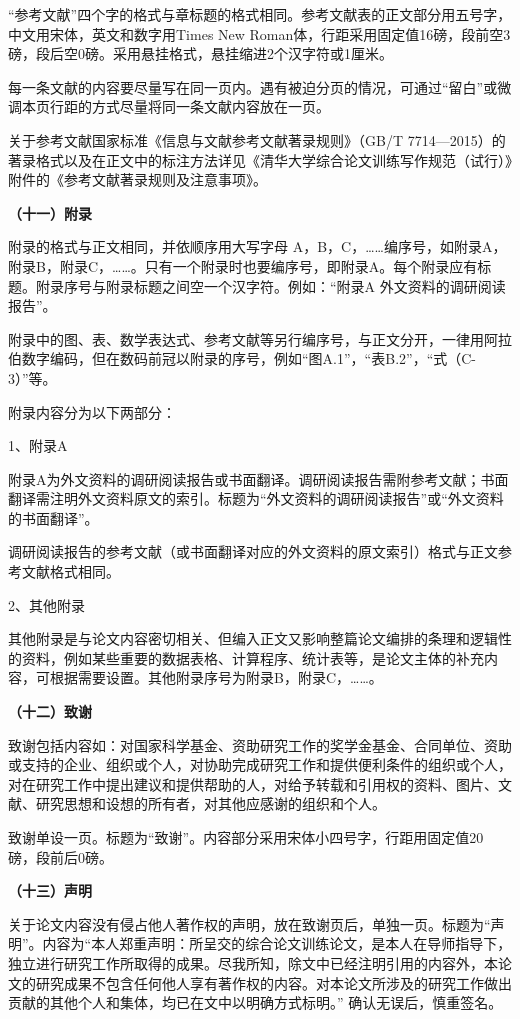 \documentclass{Diploma}
\begin{document}
\begin{}
“参考文献”四个字的格式与章标题的格式相同。参考文献表的正文部分用五号字，中文用宋体，英文和数字用Times New Roman体，行距采用固定值16磅，段前空3磅，段后空0磅。采用悬挂格式，悬挂缩进2个汉字符或1厘米。

每一条文献的内容要尽量写在同一页内。遇有被迫分页的情况，可通过“留白”或微调本页行距的方式尽量将同一条文献内容放在一页。

关于参考文献国家标准《信息与文献参考文献著录规则》（GB/T 7714—2015）的著录格式以及在正文中的标注方法详见《清华大学综合论文训练写作规范（试行）》附件的《参考文献著录规则及注意事项》。

\noindent\textbf{（十一）附录}

附录的格式与正文相同，并依顺序用大写字母 A，B，C，……编序号，如附录A，附录B，附录C，……。只有一个附录时也要编序号，即附录A。每个附录应有标题。附录序号与附录标题之间空一个汉字符。例如：“附录A 外文资料的调研阅读报告”。

附录中的图、表、数学表达式、参考文献等另行编序号，与正文分开，一律用阿拉伯数字编码，但在数码前冠以附录的序号，例如“图A.1”，“表B.2”，“式（C-3）”等。

附录内容分为以下两部分：

1、附录A

附录A为外文资料的调研阅读报告或书面翻译。调研阅读报告需附参考文献；书面翻译需注明外文资料原文的索引。标题为“外文资料的调研阅读报告”或“外文资料的书面翻译”。

调研阅读报告的参考文献（或书面翻译对应的外文资料的原文索引）格式与正文参考文献格式相同。

2、其他附录

其他附录是与论文内容密切相关、但编入正文又影响整篇论文编排的条理和逻辑性的资料，例如某些重要的数据表格、计算程序、统计表等，是论文主体的补充内容，可根据需要设置。其他附录序号为附录B，附录C，……。

\noindent\textbf{（十二）致谢}

致谢包括内容如：对国家科学基金、资助研究工作的奖学金基金、合同单位、资助或支持的企业、组织或个人，对协助完成研究工作和提供便利条件的组织或个人，对在研究工作中提出建议和提供帮助的人，对给予转载和引用权的资料、图片、文献、研究思想和设想的所有者，对其他应感谢的组织和个人。

致谢单设一页。标题为“致谢”。内容部分采用宋体小四号字，行距用固定值20 磅，段前后0磅。

\noindent\textbf{（十三）声明}

关于论文内容没有侵占他人著作权的声明，放在致谢页后，单独一页。标题为“声明”。内容为“本人郑重声明：所呈交的综合论文训练论文，是本人在导师指导下，独立进行研究工作所取得的成果。尽我所知，除文中已经注明引用的内容外，本论文的研究成果不包含任何他人享有著作权的内容。对本论文所涉及的研究工作做出贡献的其他个人和集体，均已在文中以明确方式标明。” 确认无误后，慎重签名。


\end{}
\end{document}
